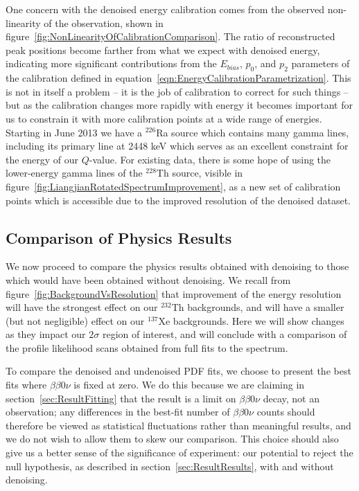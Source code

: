 One concern with the denoised energy calibration comes from the observed non-linearity of the observation, shown in figure~\ref{fig:NonLinearityOfCalibrationComparison}.  The ratio of reconstructed peak positions become farther from what we expect with denoised energy, indicating more significant contributions from the $E_{bias}$, $p_0$, and $p_2$ parameters of the calibration defined in equation~\ref{eqn:EnergyCalibrationParametrization}.  This is not in itself a problem -- it is the job of calibration to correct for such things -- but as the calibration changes more rapidly with energy it becomes important for us to constrain it with more calibration points at a wide range of energies.  Starting in June 2013 we have a $^{226}$Ra source which contains many gamma lines, including its primary line at 2448 keV which serves as an excellent constraint for the energy of our $Q$-value.  For existing data, there is some hope of using the lower-energy gamma lines of the $^{228}$Th source, visible in figure~\ref{fig:LiangjianRotatedSpectrumImprovement}, as a new set of calibration points which is accessible due to the improved resolution of the denoised dataset.

\subsection{Comparison of Physics Results}\label{sec:ResultComparisonPhysics}

We now proceed to compare the physics results obtained with denoising to those which would have been obtained without denoising.  We recall from figure~\ref{fig:BackgroundVsResolution} that improvement of the energy resolution will have the strongest effect on our $^{232}$Th backgrounds, and will have a smaller (but not negligible) effect on our $^{137}$Xe backgrounds.  Here we will show changes as they impact our $2\sigma$ region of interest, and will conclude with a comparison of the profile likelihood scans obtained from full fits to the spectrum.

To compare the denoised and undenoised PDF fits, we choose to present the best fits where $\beta\beta 0\nu$ is fixed at zero.  We do this because we are claiming in section~\ref{sec:ResultFitting} that the result is a limit on $\beta\beta 0\nu$ decay, not an observation; any differences in the best-fit number of $\beta\beta 0\nu$ counts should therefore be viewed as statistical fluctuations rather than meaningful results, and we do not wish to allow them to skew our comparison.  This choice should also give us a better sense of the significance of experiment: our potential to reject the null hypothesis, as described in section~\ref{sec:ResultResults}, with and without denoising.

